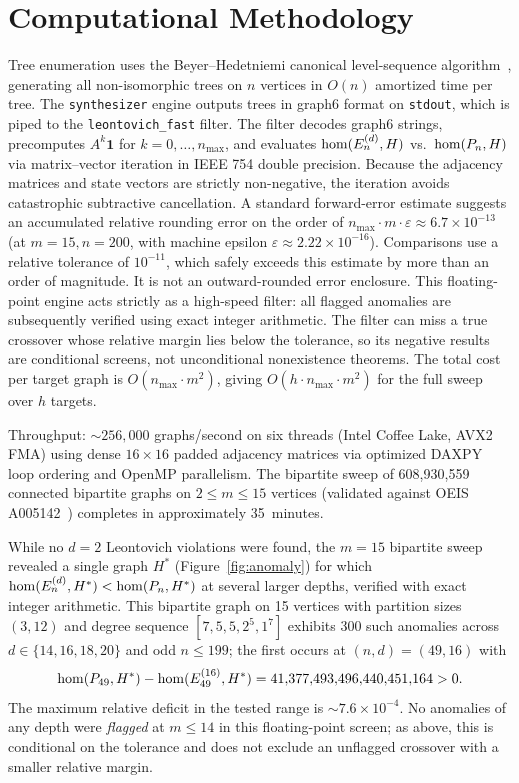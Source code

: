 \section{Computational Methodology}
\label{sec:computation}

Tree enumeration uses the Beyer--Hedetniemi canonical level-sequence
algorithm~\cite{BeyerH80}, generating all non-isomorphic trees on $n$ vertices in
$O(n)$ amortized time per tree. The \texttt{synthesizer} engine outputs
trees in graph6 format on \texttt{stdout}, which is piped to the
\texttt{leontovich\_fast} filter. The filter decodes graph6 strings,
precomputes $A^k \mathbf{1}$ for $k = 0, \ldots, n_{\max}$, and evaluates
$\mathrm{hom}(E_n^{(d)}, H)$ vs.\ $\mathrm{hom}(P_n, H)$ via matrix--vector iteration in
IEEE 754 double precision. Because the adjacency matrices and state vectors
are strictly non-negative, the iteration avoids catastrophic subtractive
cancellation. A standard forward-error estimate suggests an accumulated
relative rounding error on the order of
$n_{\max} \cdot m \cdot \varepsilon \approx 6.7 \times 10^{-13}$ (at
$m=15, n=200$, with machine epsilon $\varepsilon \approx 2.22 \times 10^{-16}$).
Comparisons use a relative tolerance of $10^{-11}$, which safely exceeds this
estimate by more than an order of magnitude. It is not an outward-rounded
error enclosure. This floating-point engine acts strictly as a high-speed
filter: all flagged anomalies are subsequently verified using exact
integer arithmetic. The filter can miss a true crossover whose relative margin
lies below the tolerance, so its negative results are conditional screens, not
unconditional nonexistence theorems.
The total cost per target graph is $O(n_{\max} \cdot m^2)$, giving
$O(h \cdot n_{\max} \cdot m^2)$ for the full sweep over $h$ targets.

Throughput: $\sim\!256{,}000$ graphs/second on six threads (Intel
Coffee Lake, AVX2 FMA) using dense $16 \times 16$ padded adjacency
matrices via optimized DAXPY loop
ordering and OpenMP parallelism. The bipartite sweep
of 608,930,559 connected bipartite graphs on $2 \le m \le 15$ vertices
(validated against OEIS A005142~\cite{oeis}) completes in approximately
35~minutes.

\begin{remark}
\label{rem:depth_anomaly}
While no $d = 2$ Leontovich violations were found, the $m = 15$
bipartite sweep revealed a single graph $H^*$ (Figure~\ref{fig:anomaly})
for which $\mathrm{hom}(E_n^{(d)}, H^*) < \mathrm{hom}(P_n, H^*)$ at several larger
depths, verified with exact integer arithmetic.
This bipartite graph on 15 vertices with partition sizes $(3,12)$
and degree sequence $[7, 5, 5, 2^5, 1^7]$ exhibits 300
such anomalies across $d \in \{14,16,18,20\}$ and odd
$n \le 199$; the first occurs at $(n,d)=(49,16)$ with
\[
  \mathrm{hom}(P_{49},H^*)-\mathrm{hom}(E_{49}^{(16)},H^*) =
  41{,}377{,}493{,}496{,}440{,}451{,}164 > 0.
\]
The maximum relative deficit in the tested range is
$\sim 7.6 \times 10^{-4}$.
No anomalies of any depth were \emph{flagged} at $m \le 14$ in this
floating-point screen; as above, this is conditional on the tolerance and does
not exclude an unflagged crossover with a smaller relative margin.
\end{remark}

